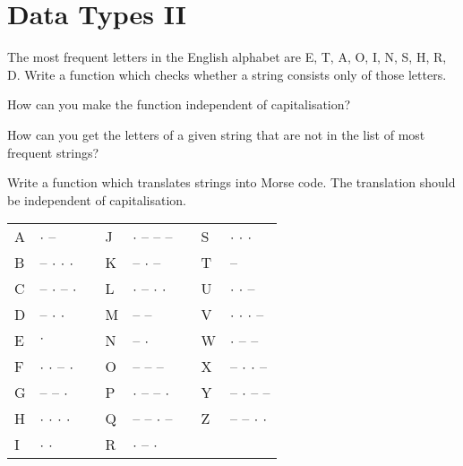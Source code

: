 \section*{Data Types II}

\begin{aufgabe}

The most frequent letters in the English alphabet are E, T, A, O, I, N, S, H, R, D. Write a function which checks whether a string consists only of those letters.
\begin{teilaufgabe}
How can you make the function independent of capitalisation?
\end{teilaufgabe}
\begin{teilaufgabe}
How can you get the letters of a given string that are not in the list of most frequent strings?
\end{teilaufgabe}
\end{aufgabe}


\begin{aufgabe}
Write a function which translates strings into Morse code. The translation should be independent of capitalisation.

\begin{tabular}[h]{|l|ll|l|ll|l|l|}
\hline
A&$\cdot$ --&&J&$\cdot$ -- -- --&&S&$\cdot$ $\cdot$ $\cdot$\\
B&-- $\cdot$ $\cdot$ $\cdot$&&K&-- $\cdot$ --&&T&--\\
C&-- $\cdot$ -- $\cdot$&&L&$\cdot$ -- $\cdot$ $\cdot$&&U&$\cdot$ $\cdot$ --\\
D&-- $\cdot$ $\cdot$&&M&-- --&&V&$\cdot$ $\cdot$ $\cdot$ --\\
E&$\cdot$&&N&-- $\cdot$&&W&$\cdot$ -- --\\
F&$\cdot$ $\cdot$ -- $\cdot$&&O&-- -- --&&X&-- $\cdot$ $\cdot$ --\\
G&-- -- $\cdot$&&P&$\cdot$ -- -- $\cdot$&&Y&-- $\cdot$ -- --\\
H&$\cdot$ $\cdot$ $\cdot$ $\cdot$&&Q&-- -- $\cdot$ --&&Z&-- -- $\cdot$ $\cdot$\\
I&$\cdot$ $\cdot$&&R&$\cdot$ -- $\cdot$&&&\\
\hline
\end{tabular}
\end{aufgabe}

